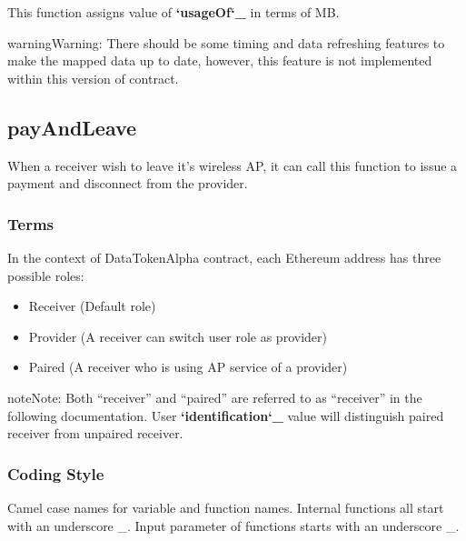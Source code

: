 \documentclass[letterpaper,10pt,english]{sphinxmanual}
\begin{document}
This function assigns value of {\color{red}\bfseries{}{}`usageOf{}`\_} in terms of MB.

\begin{sphinxadmonition}{warning}{Warning:}
There should be some timing and data refreshing features to make the mapped data up to date, however, this feature is not implemented within this version of contract.
\end{sphinxadmonition}


\subsection{payAndLeave}
\label{\detokenize{PublicFunctions:payandleave}}
%
\begin{sphinxVerbatim}[commandchars=\\\{\}]
     
\end{sphinxVerbatim}

When a receiver wish to leave it’s wireless AP, it can call this function to issue a payment and disconnect from the provider.


\subsubsection{Terms}
\label{\detokenize{PublicFunctions:terms}}
In the context of DataTokenAlpha contract, each Ethereum address
has three possible roles:
\begin{itemize}
\item {} 
Receiver (Default role)

\item {} 
Provider (A receiver can switch user role as provider)

\item {} 
Paired (A receiver who is using AP service of a provider)

\end{itemize}

\begin{sphinxadmonition}{note}{Note:}
Both “receiver” and “paired” are referred to as “receiver” in the following documentation. User {\color{red}\bfseries{}{}`identification{}`\_} value will distinguish paired receiver from unpaired receiver.
\end{sphinxadmonition}


\subsubsection{Coding Style}
\label{\detokenize{PublicFunctions:coding-style}}
Camel case names for variable and function names.
Internal functions all start with an underscore \_.
Input parameter of functions starts with an underscore \_.
\end{document}
